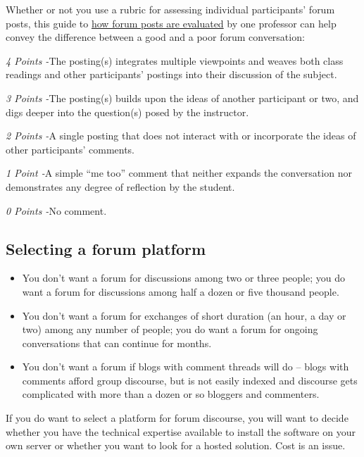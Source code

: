 Whether or not you use a rubric for assessing individual participants'
forum posts, this guide to
\href{http://www.wpi.edu/Academics/ATC/Collaboratory/Idea/boards.html}{how
forum posts are evaluated} by one professor can help convey the
difference between a good and a poor forum conversation:

\emph{4 Points -}The posting(s) integrates multiple viewpoints and
weaves both class readings and other participants' postings into their
discussion of the subject.

\emph{3 Points -}The posting(s) builds upon the ideas of another
participant or two, and digs deeper into the question(s) posed by the
instructor.

\emph{2 Points -}A single posting that does not interact with or
incorporate the ideas of other participants' comments.

\emph{1 Point -}A simple ``me too'' comment that neither expands the
conversation nor demonstrates any degree of reflection by the student.

\emph{0 Points -}No comment.

\hypertarget{selecting-a-forum-platform}{%
\subsection{Selecting a forum
platform}\label{selecting-a-forum-platform}}

\begin{itemize}
\tightlist
\item
  You don't want a forum for discussions among two or three people; you
  do want a forum for discussions among half a dozen or five thousand
  people.
\item
  You don't want a forum for exchanges of short duration (an hour, a day
  or two) among any number of people; you do want a forum for ongoing
  conversations that can continue for months.
\item
  You don't want a forum if blogs with comment threads will do -- blogs
  with comments afford group discourse, but is not easily indexed and
  discourse gets complicated with more than a dozen or so bloggers and
  commenters.
\end{itemize}

If you do want to select a platform for forum discourse, you will want
to decide whether you have the technical expertise available to install
the software on your own server or whether you want to look for a hosted
solution. Cost is an issue.

